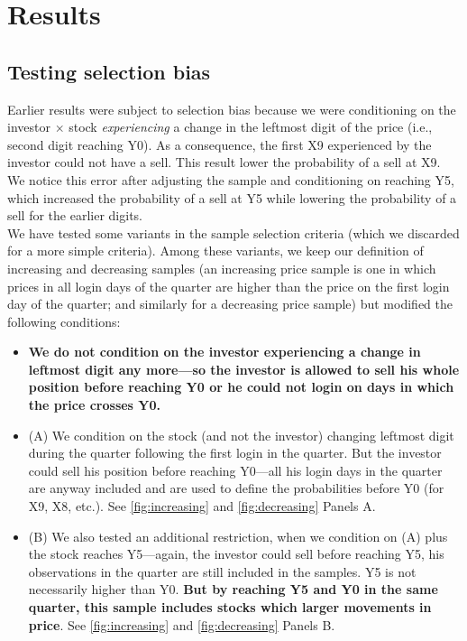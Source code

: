\documentclass[
	USenglish,12pt,paper=a4,numbers=noenddot,abstract=on,
	final,%
	fullsample,
    ]{scrartcl}
\begin{document}
\section{Results}

\subsection{Testing selection bias}
Earlier results were subject to selection bias because we were conditioning on the investor $\times$ stock \textit{experiencing} a change in the leftmost digit of the price (i.e., second digit reaching Y0). As a consequence, the first X9 experienced by the investor could not have a sell. This result lower the probability of a sell at X9. We notice this error after adjusting the sample and conditioning on reaching Y5, which increased the probability of a sell at Y5 while lowering the probability of a sell for the earlier digits. \\
We have tested some variants in the sample selection criteria (which we discarded for a more simple criteria). Among these variants, we keep our definition of increasing and decreasing samples (an increasing price sample is one in which prices in all login days of the quarter are higher than the price on the first login day of the quarter; and similarly for a decreasing price sample) but modified the following conditions: 
\begin{itemize}
\item \textbf{We do not condition on the investor experiencing a change in leftmost digit any more---so the investor is allowed to sell his whole position before reaching Y0 or he could not login on days in which the price crosses Y0.}
\item (A) We condition on the stock (and not the investor) changing leftmost digit during the quarter following the first login in the quarter. But the investor could sell his position before reaching Y0---all his login days in the quarter are anyway included and are used to define the probabilities before Y0 (for X9, X8, etc.). See \ref{fig:increasing} and \ref{fig:decreasing} Panels A.
\item (B) We also tested an additional restriction, when we condition on (A) plus the stock reaches Y5---again, the investor could sell before reaching Y5, his observations in the quarter are still included in the samples. Y5 is not necessarily higher than Y0. \textbf{But by reaching Y5 and Y0 in the same quarter, this sample includes stocks which larger movements in price}. See \ref{fig:increasing} and \ref{fig:decreasing} Panels B.
\end{itemize}
\end{document}
